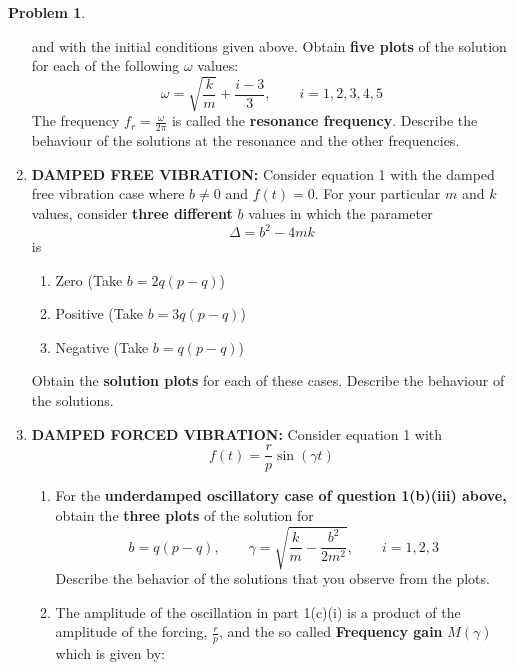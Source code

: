 \documentclass[10pt]{article}
\theoremstyle{definition}
\newtheorem{problem}{Problem}
\begin{document}
\begin{problem}
\begin{enumerate}[label=(\alph*)]
        and with the initial conditions given above. Obtain \textbf{five plots} of the solution for each of the following $\omega$ values:
        \begin{equation}
          \omega=\sqrt{\frac{k}{m}}+\frac{i-3}{3},\qquad i=1,2,3,4,5
        \end{equation}
        The frequency $f_r=\frac{\omega}{2\pi}$ is called the \textbf{resonance frequency}. Describe the behaviour of the solutions
        at the resonance and the other frequencies.
  \item \textbf{DAMPED FREE VIBRATION:} Consider equation 1 with the damped free vibration case where $b \neq 0$ and $f (t) = 0$.
        For your particular $m$ and $k$ values, consider \textbf{three different} $b$ values in which the parameter
        \begin{equation}
          \Delta=b^2-4mk
        \end{equation}
        is
        \begin{enumerate}[label=\roman*.]
          \item Zero (Take $b=2q\left(p-q\right)$)
          \item Positive (Take $b=3q\left(p-q\right)$)
          \item Negative (Take $b=q\left(p-q\right)$)
        \end{enumerate}
        Obtain the \textbf{solution plots} for each of these cases. Describe the behaviour of the solutions.
  \item \textbf{DAMPED FORCED VIBRATION:} Consider equation 1 with
        \begin{equation}
          f(t)=\frac{r}{p}\sin\left(\gamma t\right)
        \end{equation}
        \begin{enumerate}[label=\roman*.]
          \item For the \textbf{underdamped oscillatory case of question 1(b)(iii) above,} obtain
                the \textbf{three plots} of the solution for
                \begin{equation}
                  b=q\left(p-q\right), \qquad \gamma=\sqrt{\frac{k}{m}-\frac{b^2}{2m^2}}, \qquad i=1,2,3
                \end{equation}
                Describe the behavior of the solutions that you observe from the plots.
          \item The amplitude of the oscillation in part 1(c)(i) is a product of the amplitude of the forcing, $\frac{r}{p}$, and the so called \textbf{Frequency gain} $M\left(\gamma\right)$ which is given by:

\end{enumerate}
\end{enumerate}
\end{problem}
\end{document}

